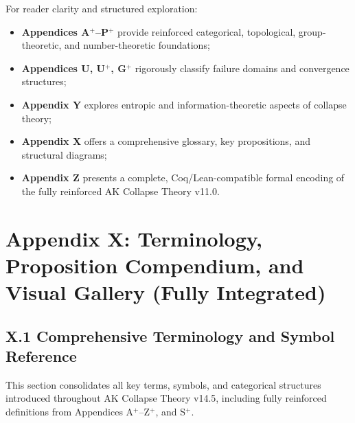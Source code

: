 \documentclass[11pt]{article}
\begin{document}
For reader clarity and structured exploration:

\begin{itemize}
    \item \textbf{Appendices A$^{+}$–P$^{+}$} provide reinforced categorical, topological, group-theoretic, and number-theoretic foundations;
    \item \textbf{Appendices U, U$^{+}$, G$^{+}$} rigorously classify failure domains and convergence structures;
    \item \textbf{Appendix Y} explores entropic and information-theoretic aspects of collapse theory;
    \item \textbf{Appendix X} offers a comprehensive glossary, key propositions, and structural diagrams;
    \item \textbf{Appendix Z} presents a complete, Coq/Lean-compatible formal encoding of the fully reinforced AK Collapse Theory v11.0.
\end{itemize}




\section*{Appendix X: Terminology, Proposition Compendium, and Visual Gallery (Fully Integrated)}

\subsection*{X.1 Comprehensive Terminology and Symbol Reference}

This section consolidates all key terms, symbols, and categorical structures introduced throughout AK Collapse Theory v14.5, including fully reinforced definitions from Appendices A$^{+}$–Z$^{+}$, and S$^{+}$.
\end{document}
